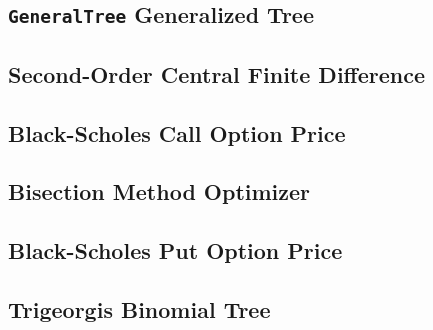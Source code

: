 \documentclass[10pt]{article}
\begin{document}
    \subsection{\texttt{GeneralTree} Generalized Tree} \label{appendix:fe621:generaltree}
        
    
    \subsection{Second-Order Central Finite Difference} \label{appendix:fe621:2cfd}
        

    \subsection{Black-Scholes Call Option Price} \label{appendix:fe621:bs_call}
        

    \subsection{Bisection Method Optimizer} \label{appendix:fe621:bisection}
        
    
    \subsection{Black-Scholes Put Option Price} \label{appendix:fe621:bs_put}
        
    
    \subsection{Trigeorgis Binomial Tree} \label{appendix:fe621:trigeorgis}
        

\end{document}
